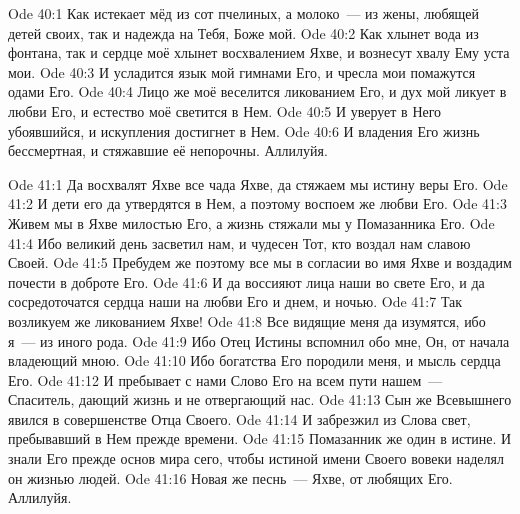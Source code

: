 \vs Ode 40:1
Как истекает
мёд из сот пчелиных, а молоко~--- из жены, любящей детей своих, так и надежда на
Тебя, Боже мой.
\vs Ode 40:2
Как хлынет
вода из фонтана, так и сердце моё хлынет восхвалением Яхве, и вознесут хвалу Ему
уста мои.
\vs Ode 40:3
И усладится
язык мой гимнами Его, и чресла мои помажутся одами Его.
\vs Ode 40:4
Лицо же моё
веселится ликованием Его, и дух мой ликует в любви Его, и естество моё светится
в Нем.
\vs Ode 40:5
И уверует в
Него убоявшийся, и искупления достигнет в Нем.
\vs Ode 40:6
И владения Его
жизнь бессмертная, и стяжавшие её непорочны.
Аллилуйя.

\vs Ode 41:1
Да восхвалят
Яхве все чада Яхве, да стяжаем мы истину веры Его.
\vs Ode 41:2
И дети его да
утвердятся в Нем, а поэтому воспоем же любви Его.
\vs Ode 41:3
Живем мы в
Яхве милостью Его, а жизнь стяжали мы у Помазанника Его.
\vs Ode 41:4
Ибо великий
день засветил нам, и чудесен Тот, кто воздал нам славою Своей.
\vs Ode 41:5
Пребудем же
поэтому все мы в согласии во имя Яхве и воздадим почести в доброте Его.
\vs Ode 41:6
И да воссияют
лица наши во свете Его, и да сосредоточатся сердца наши на любви Его и днем, и
ночью.
\vs Ode 41:7
Так возликуем
же ликованием Яхве!
\vs Ode 41:8
Все видящие
меня да изумятся, ибо я~--- из иного рода.
\vs Ode 41:9
Ибо Отец
Истины вспомнил обо мне, Он, от начала владеющий мною.
\vs Ode 41:10
Ибо богатства
Его породили меня, и мысль сердца Его.
\vs Ode 41:12
И пребывает с
нами Слово Его на всем пути нашем~--- Спаситель, дающий жизнь и не отвергающий
нас.
\vs Ode 41:13
Сын же
Всевышнего явился в совершенстве Отца Своего.
\vs Ode 41:14
И забрезжил
из Слова свет, пребывавший в Нем прежде времени.
\vs Ode 41:15
Помазанник же
один в истине. И знали Его прежде основ мира сего, чтобы истиной имени Своего
вовеки наделял он жизнью людей.
\vs Ode 41:16
Новая же
песнь~--- Яхве, от любящих Его.
Аллилуйя.

